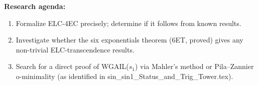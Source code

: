 \documentclass[11pt]{article}
\begin{document}
\noindent\textbf{Research agenda:}
\begin{enumerate}
  \item Formalize ELC-4EC precisely; determine if it follows from known results.
  \item Investigate whether the six exponentials theorem (6ET, proved) gives
    any non-trivial ELC-transcendence results.
  \item Search for a direct proof of WGAIL($s_1$) via Mahler's method or
    Pila--Zannier o-minimality (as identified in sin\_sin1\_Status\_and\_Trig\_Tower.tex).
\end{enumerate}
\end{document}
